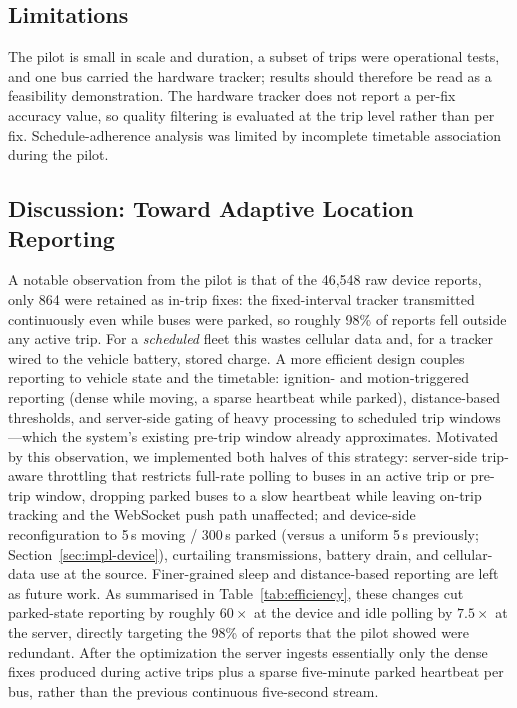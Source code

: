 \documentclass[conference]{IEEEtran}
\begin{document}
\subsection{Limitations}
The pilot is small in scale and duration, a subset of trips were operational
tests, and one bus carried the hardware tracker; results should therefore be
read as a feasibility demonstration. The hardware tracker does not report a
per-fix accuracy value, so quality filtering is evaluated at the trip level
rather than per fix. Schedule-adherence analysis was limited by incomplete
timetable association during the pilot.

\subsection{Discussion: Toward Adaptive Location Reporting}
\label{sec:eval-discussion}
A notable observation from the pilot is that of the 46{,}548 raw device
reports, only 864 were retained as in-trip fixes: the fixed-interval tracker
transmitted continuously even while buses were parked, so roughly 98\% of
reports fell outside any active trip. For a \emph{scheduled} fleet this wastes
cellular data and, for a tracker wired to the vehicle battery, stored charge.
A more efficient design couples reporting to vehicle state and the timetable:
ignition- and motion-triggered reporting (dense while moving, a sparse
heartbeat while parked), distance-based thresholds, and server-side gating of
heavy processing to scheduled trip windows---which the system's existing
pre-trip window already approximates. Motivated by this observation, we implemented both halves of this strategy:
server-side trip-aware throttling that restricts full-rate polling to buses
in an active trip or pre-trip window, dropping parked buses to a slow
heartbeat while leaving on-trip tracking and the WebSocket push path
unaffected; and device-side reconfiguration to 5\,s moving / 300\,s parked
(versus a uniform 5\,s previously; Section~\ref{sec:impl-device}),
curtailing transmissions, battery drain, and cellular-data use at the
source. Finer-grained sleep and distance-based reporting are left as future
work. As summarised in
Table~\ref{tab:efficiency}, these changes cut parked-state reporting by roughly
$60\times$ at the device and idle polling by $7.5\times$ at the server, directly
targeting the 98\% of reports that the pilot showed were redundant. After the optimization the server ingests
essentially only the dense fixes produced during active trips plus a sparse
five-minute parked heartbeat per bus, rather than the previous continuous
five-second stream.
\end{document}
